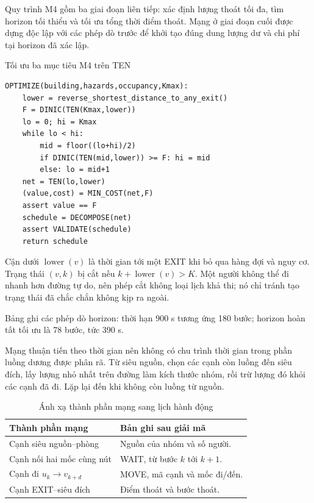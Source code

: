 Quy trình M4 gồm ba giai đoạn liên tiếp: xác định lượng thoát tối đa, tìm horizon tối thiểu và tối ưu tổng thời điểm thoát. Mạng ở giai đoạn cuối được dựng độc lập với các phép dò trước để khởi tạo đúng dung lượng dư và chi phí tại horizon đã xác lập.
\begin{algorithm}[htbp]\caption{Tối ưu ba mục tiêu M4 trên TEN}\label{alg:5}
\begin{lstlisting}[frame=none]
OPTIMIZE(building,hazards,occupancy,Kmax):
    lower = reverse_shortest_distance_to_any_exit()
    F = DINIC(TEN(Kmax,lower))
    lo = 0; hi = Kmax
    while lo < hi:
        mid = floor((lo+hi)/2)
        if DINIC(TEN(mid,lower)) >= F: hi = mid
        else: lo = mid+1
    net = TEN(lo,lower)
    (value,cost) = MIN_COST(net,F)
    assert value == F
    schedule = DECOMPOSE(net)
    assert VALIDATE(schedule)
    return schedule
\end{lstlisting}
\end{algorithm}
Cận dưới $\operatorname{lower}(v)$ là thời gian tới một EXIT khi bỏ qua hàng đợi và nguy cơ. Trạng thái $(v,k)$ bị cắt nếu $k+\operatorname{lower}(v)>K$. Một người không thể đi nhanh hơn đường tự do, nên phép cắt không loại lịch khả thi; nó chỉ tránh tạo trạng thái đã chắc chắn không kịp ra ngoài.


Bảng ghi các phép dò horizon: thời hạn 900 s tương ứng 180 bước; horizon hoàn tất tối ưu là 78 bước, tức 390 s.

Mạng thuận tiến theo thời gian nên không có chu trình thời gian trong phần luồng dương được phân rã. Từ siêu nguồn, chọn các cạnh còn luồng đến siêu đích, lấy lượng nhỏ nhất trên đường làm kích thước nhóm, rồi trừ lượng đó khỏi các cạnh đã đi. Lặp lại đến khi không còn luồng từ nguồn.

\begin{table}[htbp]\centering\caption{Ánh xạ thành phần mạng sang lịch hành động}
\small\begin{tabularx}{\linewidth}{P{4cm}X}\toprule
Thành phần mạng & Bản ghi sau giải mã\\\midrule
Cạnh siêu nguồn--phòng & Nguồn của nhóm và số người.\\
Cạnh nối hai mốc cùng nút & WAIT, từ bước $k$ tới $k+1$.\\
Cạnh đi $u_k\to v_{k+d}$ & MOVE, mã cạnh và mốc đi/đến.\\
Cạnh EXIT--siêu đích & Điểm thoát và bước thoát.\\\bottomrule
\end{tabularx}\end{table}

